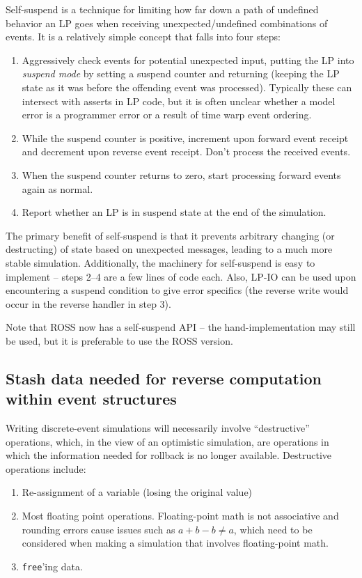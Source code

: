 \documentclass[conference,10pt,compsocconf,onecolumn]{IEEEtran}
\begin{document}
Self-suspend is a technique for limiting how far down a path of undefined
behavior an LP goes when receiving unexpected/undefined combinations of events.
It is a relatively simple concept that falls into four steps:
\begin{enumerate}
    \item Aggressively check events for potential unexpected input, putting the
        LP into \emph{suspend mode} by setting a suspend counter and returning
        (keeping the LP state as it was before the offending event was
        processed). Typically these can intersect with asserts in LP code, but
        it is often unclear whether a model error is a programmer error or a
        result of time warp event ordering.
    \item While the suspend counter is positive, increment upon forward event
        receipt and decrement upon reverse event receipt. Don't process the
        received events.
    \item When the suspend counter returns to zero, start processing forward
        events again as normal.
    \item Report whether an LP is in suspend state at the end of the
        simulation.
\end{enumerate}

The primary benefit of self-suspend is that it prevents arbitrary changing (or
destructing) of state based on unexpected messages, leading to a much more
stable simulation. Additionally, the machinery for self-suspend is easy to
implement -- steps 2--4 are a few lines of code each. Also, LP-IO can be
used upon encountering a suspend condition to give error specifics (the reverse
write would occur in the reverse handler in step 3).

Note that ROSS now has a self-suspend API -- the hand-implementation may still
be used, but it is preferable to use the ROSS version.

\subsection{Stash data needed for reverse computation within event structures}

Writing discrete-event simulations will necessarily involve ``destructive''
operations, which, in the view of an optimistic simulation, are operations in
which the information needed for rollback is no longer available. Destructive
operations include:
\begin{enumerate}
    \item Re-assignment of a variable (losing the original value)
    \item Most floating point operations. Floating-point math is not
        associative and rounding errors cause issues such as
        $a+b-b \neq a$, which need to be considered when making a simulation
        that involves floating-point math.
    \item \texttt{free}'ing data.
\end{enumerate}
\end{document}
